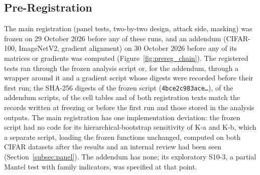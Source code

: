 \subsection{Pre-Registration}
\label{subsec:prereg}

The main registration (panel tests, two-by-two design, attack side, masking) was frozen on 29 October 2026 before any of these runs, and an addendum (CIFAR-100, ImageNetV2, gradient alignment) on 30 October 2026 before any of its matrices or gradients was computed (Figure~\ref{fig:prereg_chain}). The registered tests ran through the frozen analysis script or, for the addendum, through a wrapper around it and a gradient script whose digests were recorded before their first run; the SHA-256 digests of the frozen script (\texttt{4bce2c983ace\ldots}), of the addendum scripts, of the cell tables and of both registration texts match the records written at freezing or before the first run and those stored in the analysis outputs. The main registration has one implementation deviation: the frozen script had no code for its hierarchical-bootstrap sensitivity of K-a and K-b, which a separate script, loading the frozen functions unchanged, computed on both CIFAR datasets after the results and an internal review had been seen (Section~\ref{subsec:panel}). The addendum has none; its exploratory S10-3, a partial Mantel test with family indicators, was specified at that point.

